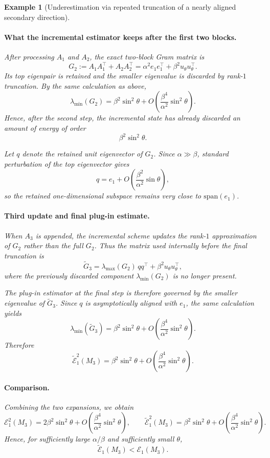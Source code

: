 \documentclass[10pt]{article} %
\newtheorem{example}{Example}
\begin{document}
\begin{example}[Underestimation via repeated truncation of a nearly aligned secondary direction]
\paragraph{What the incremental estimator keeps after the first two blocks.}
After processing $A_1$ and $A_2$, the exact two-block Gram matrix is
\[
G_2 := A_1A_1^\top + A_2A_2^\top
=
\alpha^2 e_1 e_1^\top + \beta^2 u_\theta u_\theta^\top.
\]
Its top eigenpair is retained and the smaller eigenvalue is discarded by rank-$1$ truncation.
By the same calculation as above,
\[
\lambda_{\min}(G_2)
=
\beta^2 \sin^2\theta + O\!\left(\frac{\beta^4}{\alpha^2}\sin^2\theta\right).
\]
Hence, after the second step, the incremental state has already discarded an amount of energy of order
\[
\beta^2 \sin^2\theta.
\]

Let $q$ denote the retained unit eigenvector of $G_2$. Since $\alpha\gg\beta$, standard perturbation
of the top eigenvector gives
\[
q = e_1 + O\!\left(\frac{\beta^2}{\alpha^2}\sin\theta\right),
\]
so the retained one-dimensional subspace remains very close to $\mathrm{span}(e_1)$.

\paragraph{Third update and final plug-in estimate.}
When $A_3$ is appended, the incremental scheme updates the rank-$1$ approximation of $G_2$
rather than the full $G_2$. Thus the matrix used internally before the final truncation is
\[
\widetilde G_3
=
\lambda_{\max}(G_2)\, q q^\top + \beta^2 u_\theta u_\theta^\top,
\]
where the previously discarded component $\lambda_{\min}(G_2)$ is no longer present.

The plug-in estimator at the final step is therefore governed by the smaller eigenvalue of
$\widetilde G_3$. Since $q$ is asymptotically aligned with $e_1$, the same calculation yields
\[
\lambda_{\min}(\widetilde G_3)
=
\beta^2 \sin^2\theta
+
O\!\left(\frac{\beta^4}{\alpha^2}\sin^2\theta\right).
\]
Therefore
\[
\widetilde{\mathcal{E}}_1^2(M_3)
=
\beta^2 \sin^2\theta
+
O\!\left(\frac{\beta^4}{\alpha^2}\sin^2\theta\right).
\]

\paragraph{Comparison.}
Combining the two expansions, we obtain
\[
\mathcal{E}_1^2(M_3)
=
2\beta^2 \sin^2\theta
+
O\!\left(\frac{\beta^4}{\alpha^2}\sin^2\theta\right),
\qquad
\widetilde{\mathcal{E}}_1^2(M_3)
=
\beta^2 \sin^2\theta
+
O\!\left(\frac{\beta^4}{\alpha^2}\sin^2\theta\right).
\]
Hence, for sufficiently large $\alpha/\beta$ and sufficiently small $\theta$,
\[
\widetilde{\mathcal{E}}_1(M_3) < \mathcal{E}_1(M_3).
\]


\end{example}
\end{document}
